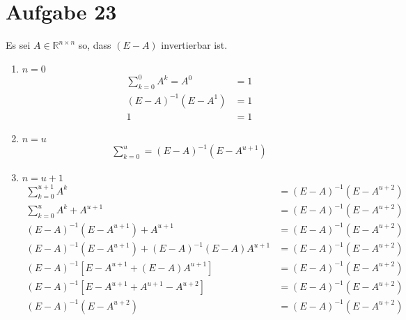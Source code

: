 \section{Aufgabe 23}

Es sei $A \in \mathbb{R}^{n \times n}$ so, dass $(E - A)$ invertierbar ist.
\begin{enumerate}[1.]
    \item $n = 0$
        \begin{align*}
            \sum_{k = 0}^0A^k = A^0 &= 1 \\
            (E - A)^{-1}(E - A^1)   &= 1 \\[5pt]
            1 &= 1
        \end{align*}
    \item $n = u$
        \begin{align*}
            \sum_{k = 0}^u = (E - A)^{-1}(E - A^{u + 1})
        \end{align*}
    \item $n = u + 1$
        \begin{align*}
            \sum_{k = 0}^{u + 1}A^k &= (E - A)^{-1}(E - A^{u + 2}) \\
            \sum_{k = 0}^{u}A^k + A^{u + 1} &= (E - A)^{-1}(E - A^{u + 2}) \\
            (E - A)^{-1}(E - A^{u + 1}) + A^{u + 1} &= (E - A)^{-1}(E - A^{u + 2}) \\
            (E - A)^{-1}(E - A^{u + 1}) + (E - A)^{-1}(E - A)A^{u + 1} &= (E - A)^{-1}(E - A^{u + 2}) \\
            (E - A)^{-1}[E - A^{u + 1} + (E - A)A^{u + 1}] &= (E - A)^{-1}(E - A^{u + 2}) \\
            (E - A)^{-1}[E - A^{u + 1} + A^{u + 1} - A^{u + 2}] &= (E - A)^{-1}(E - A^{u + 2}) \\
            (E - A)^{-1}(E - A^{u + 2}) &= (E - A)^{-1}(E - A^{u + 2})
        \end{align*}
\end{enumerate}
